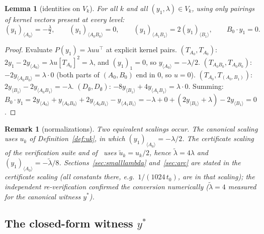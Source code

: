 \documentclass[11pt]{article}
\newtheorem{lemma}[theorem]{Lemma}
\newtheorem{remark}[theorem]{Remark}
\newcommand{\la}{\langle}
\newcommand{\ra}{\rangle}
\newcommand{\lam}{\lambda}
\begin{document}
\begin{lemma}[identities on $V_k$]\label{lem:identities}
For all $k$ and all $(y_1,\lam)\in V_k$, using only pairings of kernel
vectors present at every level:
\[
(y_1)_{\la A_0\ra}=-\tfrac\lam2,\qquad (y_1)_{\la A_0B_0\ra}=0,\qquad
(y_1)_{\la A_1B_1\ra}=2(y_1)_{\la B_1\ra},\qquad B_0\cdot y_1=0 .
\]
\end{lemma}

\begin{proof}
Evaluate $P(y_1)=\lam u u^\top$ at explicit kernel pairs.
$(T_{A_0},T_{A_0})$: $2y_1-2y_{\la A_0\ra}=\lam u[T_{A_0}]^2=\lam$, and
$(y_1)_1=0$, so $y_{\la A_0\ra}=-\lam/2$.
$(T_{A_0B_0},T_{A_0B_0})$: $-2y_{\la A_0B_0\ra}=\lam\cdot0$ (both parts of
$(A_0,B_0)$ end in $0$, so $u=0$).
$(T_{A_0},T_{(A_0,B_1)})$: $2y_{\la B_1\ra}-2y_{\la A_0B_1\ra}=-\lam$.
$(D_\emptyset,D_\emptyset)$: $-8y_{\la B_1\ra}+4y_{\la A_1B_1\ra}=\lam\cdot0$.
Summing:
$B_0\cdot y_1=2y_{\la A_0\ra}+y_{\la A_0B_0\ra}
+2y_{\la A_0B_1\ra}-y_{\la A_1B_1\ra}
=-\lam+0+(2y_{\la B_1\ra}+\lam)-2y_{\la B_1\ra}=0$.
\end{proof}

\begin{remark}[normalizations]\label{rem:norm}
Two equivalent scalings occur. The \emph{canonical} scaling uses $u_k$ of
Definition~\ref{def:uk}, in which $(y_1)_{\la A_0\ra}=-\lam/2$. The
\emph{certificate} scaling of the verification suite and
of~\cite{overshoot} uses $\tilde u_k=u_k/2$, hence $\tilde\lam=4\lam$ and
$(y_1)_{\la A_0\ra}=-\tilde\lam/8$. Sections~\ref{sec:smalllambda}
and~\ref{sec:arc} are stated in the certificate scaling (all constants
there, e.g.\ $1/(1024\,t_0)$, are in that scaling); the independent
re-verification confirmed the conversion numerically ($\tilde\lam=4$ measured for the
canonical witness $y^\ast$).
\end{remark}

\subsection{The closed-form witness $y^\ast$}
\end{document}
